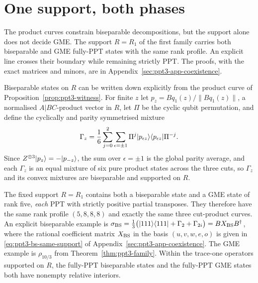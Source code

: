 \section{One support, both phases}\label{sec:ppt3-coexistence}

The product curves constrain biseparable decompositions, but the support alone does not decide GME. The support
$R=R_1$ of the first family carries both biseparable and GME fully-PPT states with the same rank profile.
An explicit line crosses their boundary while remaining strictly PPT. The proofs, with the exact matrices and minors, are in
Appendix~\ref{sec:ppt3-app-coexistence}.

Biseparable states on $R$ can be written down explicitly from the product curve of Proposition~\ref{prop:ppt3-witness}. For
finite $z$ let $p_z=Bq_1(z)/\|Bq_1(z)\|$, a normalised $A|BC$-product vector in $R$, let $\Pi$ be the cyclic qubit permutation,
and define the cyclically and parity symmetrised mixture
\begin{equation}\label{eq:ppt3-gamma}
 \Gamma_z=\frac16\sum_{j=0}^2\sum_{\epsilon=\pm1}
   \Pi^j\lvert p_{\epsilon z}\rangle\langle p_{\epsilon z}\rvert
   \Pi^{-j}.
\end{equation}
Since $Z^{\otimes3}\lvert p_z\rangle=-\lvert p_{-z}\rangle$, the sum over $\epsilon=\pm1$ is the global parity average, and each $\Gamma_z$
is an equal mixture of six pure product states across the three cuts, so $\Gamma_z$ and its convex mixtures are biseparable and supported on $R$.

\begin{theorem}
\label{thm:ppt3-phase-coexistence}
The fixed support $R=R_1$ contains both a
biseparable state and a GME state of rank five,
\emph{each} PPT with strictly positive partial
transposes. They therefore have the same rank
profile $(5,8,8,8)$ and exactly the same
three cut-product curves. An explicit
biseparable example is
$\sigma_{\rm BS}=\frac13\bigl(\lvert111\rangle\langle111\rvert+\Gamma_2+\Gamma_{2i}\bigr)=BX_{\rm BS}B^\dagger$,
where the rational coefficient matrix $X_{\rm BS}$ in the basis $(u,v,w,e,o)$ is given in
\eqref{eq:ppt3-bs-same-support} of Appendix~\ref{sec:ppt3-app-coexistence}.
The GME example is $\rho_{10/3}$ from
Theorem~\ref{thm:ppt3-family}.
Within the trace-one operators supported on $R$,
the fully-PPT biseparable states and the fully-PPT
GME states both have nonempty relative interiors.
\end{theorem}

